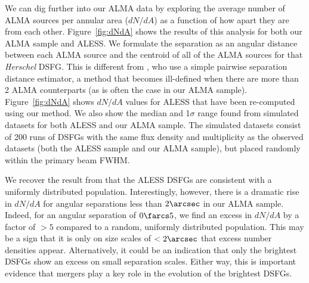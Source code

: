 \documentclass[iop]{emulateapj}
\begin{document}
We can dig further into our ALMA data by exploring the average number of ALMA
sources per annular area ($dN/dA$) as a function of how apart they are from
each other.  Figure~\ref{fig:dNdA} shows the results of this analysis for both
our ALMA sample and ALESS.  We formulate the separation as an angular distance
between each ALMA source and the centroid of all of the ALMA sources for that
{\it Herschel} DSFG.  This is different from \citet{Hodge:2013qy}, who use a
simple pairwise separation distance estimator, a method that becomes
ill-defined when there are more than 2 ALMA counterparts (as is often the case
in our ALMA sample).  Figure~\ref{fig:dNdA} shows $dN/dA$ values for ALESS that
have been re-computed using our method.  We also show the median and 1$\sigma$
range found from simulated datasets for both ALESS and our ALMA sample.  The
simulated datasets consist of 200 runs of DSFGs with the same flux density and
multiplicity as the observed datasets (both the ALESS sample and our ALMA
sample), but placed randomly within the primary beam FWHM.

We recover the result from \citet{Hodge:2013qy} that the ALESS DSFGs are
consistent with a uniformly distributed population.  Interestingly, however,
there is a dramatic rise in $dN/dA$ for angular separations less than
$2\arcsec$ in our ALMA sample.  Indeed, for an angular separation of
$0\farcs5$, we find an excess in $dN/dA$ by a factor of $>5$ compared to a
random, uniformly distributed population.  This may be a sign that it is only
on size scales of $<2\arcsec$ that excess number densities appear.
Alternatively, it could be an indication that only the brightest DSFGs show an
excess on small separation scales.  Either way, this is important evidence that
mergers play a key role in the evolution of the brightest DSFGs.
\end{document}
